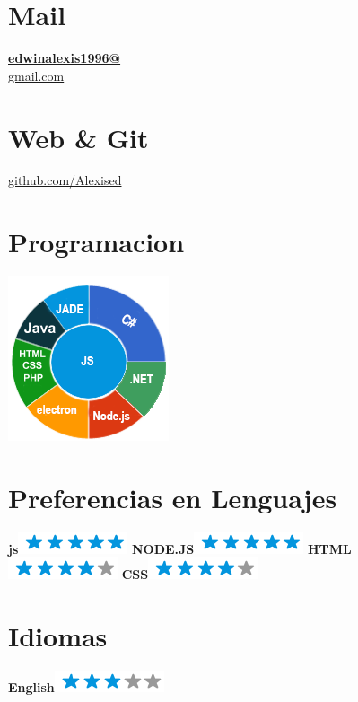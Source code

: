 \documentclass[]{friggeri-cv}
\begin{document}
\begin{aside}
  \section{Mail}
    \href{mailto:edwinalexis1996@gmail.com}{\textbf{edwinalexis1996@}\\gmail.com}
    ~
  \section{Web \& Git}
    \href{https://github.com/Alexised}{github.com/Alexised}
    ~
  \section{Programacion}
    \includegraphics[scale=0.62]{img/programming.png}
    ~
  \section{Preferencias en Lenguajes}
    \textbf{js}\includegraphics[scale=0.40]{img/5stars.png}
    \textbf{NODE.JS}\includegraphics[scale=0.40]{img/5stars.png}
    \textbf{HTML}\includegraphics[scale=0.40]{img/4stars.png}
    \textbf{CSS}\includegraphics[scale=0.40]{img/4stars.png}
    ~
   ~
  \section{Idiomas}
    \textbf{English}\includegraphics[scale=0.40]{img/3stars.png}
    ~
\end{aside}
\end{document}
